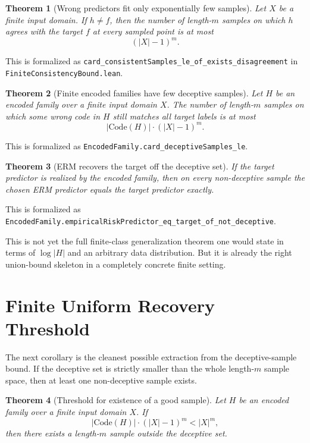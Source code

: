 \documentclass[11pt]{article}
\newtheorem{theorem}{Theorem}[section]
\theoremstyle{remark}
\begin{document}
\begin{theorem}[Wrong predictors fit only exponentially few samples]
Let \(X\) be a finite input domain.  If \(h \neq f\), then the number of
length-\(m\) samples on which \(h\) agrees with the target \(f\) at every sampled
point is at most
\[
  (|X|-1)^m.
\]
\end{theorem}

\noindent
This is formalized as
\texttt{card\_consistentSamples\_le\_of\_exists\_disagreement} in
\texttt{FiniteConsistencyBound.lean}.

\begin{theorem}[Finite encoded families have few deceptive samples]
Let \(H\) be an encoded family over a finite input domain \(X\).  The number of
length-\(m\) samples on which some wrong code in \(H\) still matches all target
labels is at most
\[
  |\mathrm{Code}(H)| \cdot (|X|-1)^m.
\]
\end{theorem}

\noindent
This is formalized as
\texttt{EncodedFamily.card\_deceptiveSamples\_le}.

\begin{theorem}[ERM recovers the target off the deceptive set]
If the target predictor is realized by the encoded family, then on every
non-deceptive sample the chosen ERM predictor equals the target predictor
exactly.
\end{theorem}

\noindent
This is formalized as
\texttt{EncodedFamily.empiricalRiskPredictor\_eq\_target\_of\_not\_deceptive}.

This is not yet the full finite-class generalization theorem one would state in
terms of \(\log |H|\) and an arbitrary data distribution.  But it is already the
right union-bound skeleton in a completely concrete finite setting.

\section{Finite Uniform Recovery Threshold}

The next corollary is the cleanest possible extraction from the deceptive-sample
bound.  If the deceptive set is strictly smaller than the whole length-\(m\)
sample space, then at least one non-deceptive sample exists.

\begin{theorem}[Threshold for existence of a good sample]
Let \(H\) be an encoded family over a finite input domain \(X\).  If
\[
  |\mathrm{Code}(H)| \cdot (|X|-1)^m < |X|^m,
\]
then there exists a length-\(m\) sample outside the deceptive set.
\end{theorem}
\end{document}
